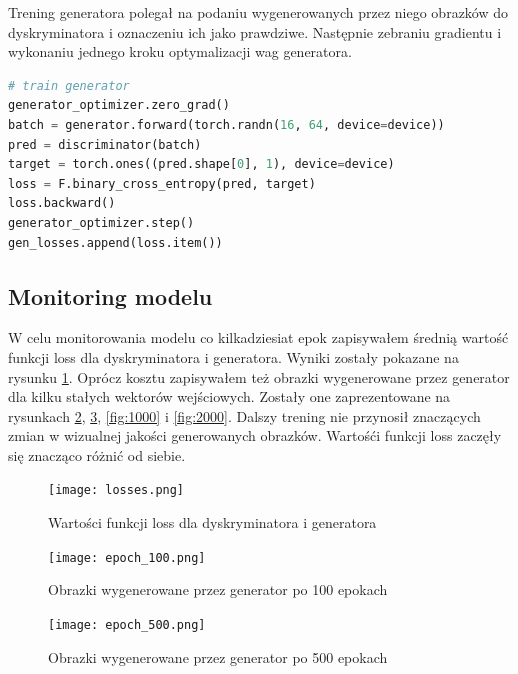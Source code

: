 \documentclass[a4paper]{article}
\begin{document}
Trening generatora polegał na podaniu wygenerowanych przez niego obrazków
do dyskryminatora i oznaczeniu ich jako prawdziwe. Następnie zebraniu gradientu
i wykonaniu jednego kroku optymalizacji wag generatora.

\begin{lstlisting}[language=python]
# train generator
generator_optimizer.zero_grad()
batch = generator.forward(torch.randn(16, 64, device=device))
pred = discriminator(batch)
target = torch.ones((pred.shape[0], 1), device=device)
loss = F.binary_cross_entropy(pred, target)
loss.backward()
generator_optimizer.step()
gen_losses.append(loss.item())
\end{lstlisting}

\subsection{Monitoring modelu}

W celu monitorowania modelu co kilkadziesiat epok zapisywałem średnią
wartość funkcji loss dla dyskryminatora i generatora. Wyniki zostały
pokazane na rysunku \ref{fig:losses}. Oprócz kosztu zapisywałem też
obrazki wygenerowane przez generator dla kilku stałych wektorów wejściowych.
Zostały one zaprezentowane na rysunkach \ref{fig:100}, \ref{fig:500},
\ref{fig:1000} i \ref{fig:2000}. Dalszy trening nie przynosił znaczących
zmian w wizualnej jakości generowanych obrazków. Wartośći funkcji loss
zaczęły się znacząco różnić od siebie.


\begin{figure}[H]
    \centering
    \texttt{[image: losses.png]}
    \caption{Wartości funkcji loss dla dyskryminatora i generatora}
    \label{fig:losses}
\end{figure}


\begin{figure}[H]
    \centering
    \texttt{[image: epoch\_100.png]}
    \caption{Obrazki wygenerowane przez generator po 100 epokach}
    \label{fig:100}
\end{figure}


\begin{figure}[H]
    \centering
    \texttt{[image: epoch\_500.png]}
    \caption{Obrazki wygenerowane przez generator po 500 epokach}
    \label{fig:500}
\end{figure}
\end{document}
